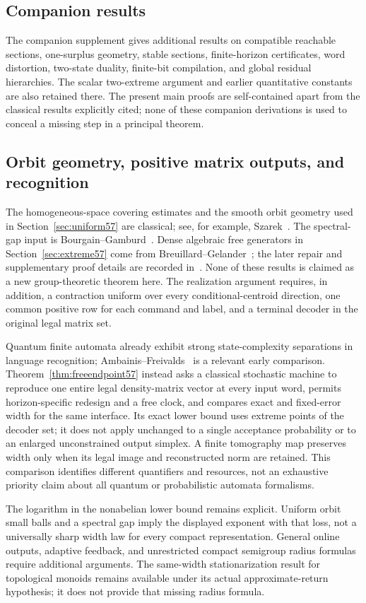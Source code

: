 \subsection{Companion results}
The companion supplement gives additional results on compatible reachable sections, one-surplus geometry, stable sections, finite-horizon certificates, word distortion, two-state duality, finite-bit compilation, and global residual hierarchies. The scalar two-extreme argument and earlier quantitative constants are also retained there. The present main proofs are self-contained apart from the classical results explicitly cited; none of these companion derivations is used to conceal a missing step in a principal theorem.

\subsection{Orbit geometry, positive matrix outputs, and recognition}
The homogeneous-space covering estimates and the smooth orbit geometry used in Section~\ref{sec:uniform57} are classical; see, for example, Szarek~\cite{Szarek57}. The spectral-gap input is Bourgain--Gamburd~\cite{BG2012}. Dense algebraic free generators in Section~\ref{sec:extreme57} come from Breuillard--Gelander~\cite[Theorem~1.1]{BreuillardGelander57}; the later repair and supplementary proof details are recorded in~\cite{BreuillardGelanderCorrection57}. None of these results is claimed as a new group-theoretic theorem here. The realization argument requires, in addition, a contraction uniform over every conditional-centroid direction, one common positive row for each command and label, and a terminal decoder in the original legal matrix set.

Quantum finite automata already exhibit strong state-complexity separations in language recognition; Ambainis--Freivalds~\cite{AF57} is a relevant early comparison. Theorem~\ref{thm:freeendpoint57} instead asks a classical stochastic machine to reproduce one entire legal density-matrix vector at every input word, permits horizon-specific redesign and a free clock, and compares exact and fixed-error width for the same interface. Its exact lower bound uses extreme points of the decoder set; it does not apply unchanged to a single acceptance probability or to an enlarged unconstrained output simplex. A finite tomography map preserves width only when its legal image and reconstructed norm are retained. This comparison identifies different quantifiers and resources, not an exhaustive priority claim about all quantum or probabilistic automata formalisms.

The logarithm in the nonabelian lower bound remains explicit. Uniform orbit small balls and a spectral gap imply the displayed exponent with that loss, not a universally sharp width law for every compact representation. General online outputs, adaptive feedback, and unrestricted compact semigroup radius formulas require additional arguments. The same-width stationarization result for topological monoids remains available under its actual approximate-return hypothesis; it does not provide that missing radius formula.
